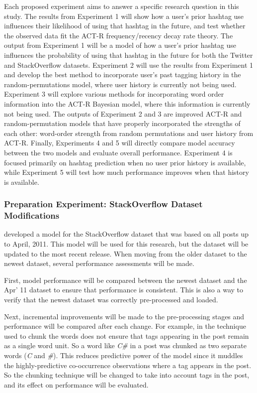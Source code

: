 \documentclass[man,floatsintext,donotrepeattitle]{apa6}
\begin{document}
Each proposed experiment aims to answer a specific research question in this study.
The results from Experiment 1 will show how a user's prior hashtag use influences their likelihood of using that hashtag in the future, and test whether the observed data fit the ACT-R frequency/recency decay rate theory.
The output from Experiment 1 will be a model of how a user's prior hashtag use influences the probability of using that hashtag in the future for both the Twitter and StackOverflow datasets.
Experiment 2 will use the results from Experiment 1 and develop the best method to incorporate user's past tagging history in the random-permutations model, where user history is currently not being used.
Experiment 3 will explore various methods for incorporating word order information into the ACT-R Bayesian model, where this information is currently not being used.
The outputs of Experiment 2 and 3 are improved ACT-R and random-permutation models that have properly incorporated the strengths of each other: word-order strength from random permutations and user history from ACT-R.
Finally, Experiments 4 and 5 will directly compare model accuracy between the two models and evaluate overall performance.
Experiment 4 is focused primarily on hashtag prediction when no user prior history is available, while Experiment 5 will test how much performance improves when that history is available.

\subsubsection{Preparation Experiment: StackOverflow Dataset Modifications}

\textcite{Stanley2013} developed a model for the StackOverflow dataset that was based on all posts up to April, 2011.
This model will be used for this research, but the dataset will be updated to the most recent release.
When moving from the older dataset to the newest dataset, several performance assessments will be made.

First, model performance will be compared between the newest dataset and the Apr' 11 dataset to ensure that performance is consistent.
This is also a way to verify that the newest dataset was correctly pre-processed and loaded.

Next, incremental improvements will be made to the pre-processing stages and performance will be compared after each change.
For example, in \textcite{Stanley2013} the technique used to chunk the words does not ensure that tags appearing in the post remain as a single word unit.
So a word like \emph{C\#} in a post was chunked as two separate words (\emph{C} and \emph{\#}).
This reduces predictive power of the model since it muddles the highly-predictive co-occurrence observations where a tag appears in the post.
So the chunking technique will be changed to take into account tags in the post, and its effect on performance will be evaluated.
\end{document}

